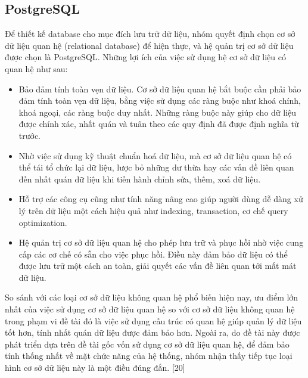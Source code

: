 \subsection{PostgreSQL}
Để thiết kế database cho mục đích lưu trữ dữ liệu, nhóm quyết định chọn cơ sở
dữ liệu quan hệ (relational database) để hiện thực, và hệ quản trị cơ sở dữ liệu
được chọn là PostgreSQL. Những lợi ích của việc sử dụng hệ cơ sở dữ liệu có quan
hệ như sau:
\begin{itemize}
    \item Bảo đảm tính toàn vẹn dữ liệu. Cơ sở dữ liệu quan hệ bắt buộc cần phải bảo đảm
          tính toàn vẹn dữ liệu, bằng việc sử dụng các ràng buộc như khoá chính, khoá
          ngoại, các ràng buộc duy nhất. Những ràng buộc này giúp cho dữ liệu được chính
          xác, nhất quán và tuân theo các quy định đã được định nghĩa từ trước.
    \item Nhờ việc sử dụng kỹ thuật chuẩn hoá dữ liệu, mà cơ sở dữ liệu quan hệ có thể
          tái tổ chức lại dữ liệu, lược bỏ những dư thừa hay các vấn đề liên quan đến
          nhất quán dữ liệu khi tiến hành chỉnh sửa, thêm, xoá dữ liệu.
    \item Hỗ trợ các công cụ cũng như tính năng nâng cao giúp người dùng dễ dàng xử lý
          trên dữ liệu một cách hiệu quả như indexing, transaction, cơ chế query
          optimization.
    \item Hệ quản trị cơ sở dữ liệu quan hệ cho phép lưu trữ và phục hồi nhờ việc cung
          cấp các cơ chế có sẵn cho việc phục hồi. Điều này đảm bảo dữ liệu có thể được
          lưu trữ một cách an toàn, giải quyết các vấn đề liên quan tới mất mát dữ liệu.
\end{itemize}
So sánh với các loại cơ sở dữ liệu không quan hệ phổ biến hiện nay, ưu điểm lớn nhất của việc sử dụng cơ sở dữ liệu quan hệ so với cơ sở dữ liệu không quan hệ trong phạm vi đề tài đó là việc sử dụng cấu trúc có quan hệ giúp quản lý dữ liệu tốt hơn, tính nhất quán dữ liệu được đảm bảo hơn. Ngoài ra, do đề tài này được phát triển dựa trên đề tài gốc vốn sử dụng cơ sở dữ liệu quan hệ, để đảm bảo tính thống nhất về mặt chức năng của hệ thống, nhóm nhận thấy tiếp tục loại hình cơ sở dữ liệu này là một điều đúng đắn. [20]